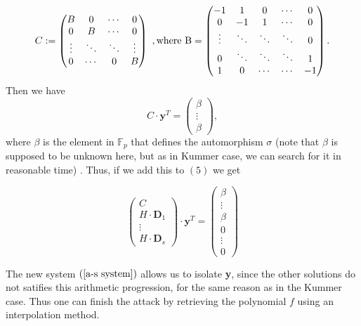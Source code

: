 \documentclass[10pt]{article}
\newcommand{\cd}{\cdot}
\begin{document}
\begin{equation*} 
C := 
\begin{pmatrix}
B & 0 & \cdots & 0 \\
0 & B & \cdots & 0 \\
\vdots & \ddots & \ddots & \vdots \\
0 & \cdots & 0 & B
\end{pmatrix} \ , \rm where  \ 
B = 
\begin{pmatrix}
-1 & 1 & 0 & \cdots & 0 \\
0 & -1 & 1 & \cdots & 0 \\
\vdots & \ddots & \ddots & \ddots & 0 \\
0 & \ddots & \ddots & \ddots & 1 \\
1 & 0 & \cdots & \cdots & -1
\end{pmatrix}.
\end{equation*}
 Then we have
\begin{equation*}
C \cd \textbf{y}^T
= 
\begin{pmatrix}
\beta \\
\vdots \\
\beta
\end{pmatrix},
\end{equation*}
where $\beta$ is the element in $\mathbb{F}_p$ that defines the automorphism $\sigma$ (note that $\beta$ is supposed to be unknown here, but as in Kummer case, we can search for it in reasonable time) . Thus, if we add this to $(5)$ we get

\begin{equation} \label{a-s system}
\begin{pmatrix}
C\\
H \cd \textbf{D}_1 \\
\vdots \\
H \cd \textbf{D}_s
\end{pmatrix}
\cd \textbf{y}^T = 
\begin{pmatrix}
\beta \\
\vdots \\
\beta \\
0 \\
\vdots \\
0
\end{pmatrix} 
\end{equation}

The new system $(\ref{a-s system})$ allows us to isolate \textbf{y}, since the other solutions do not satifies this arithmetic progression, for the same reason as in the Kummer case. Thus one can finish the attack by retrieving the polynomial $f$ using an interpolation method. 
\end{document}
